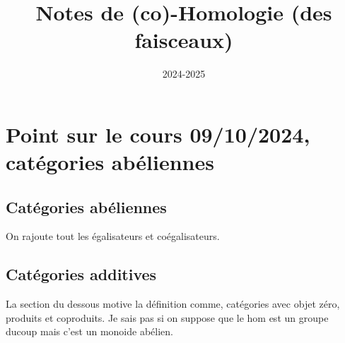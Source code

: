 \documentclass[a4paper,12pt]{book}
\title{Notes de (co)-Homologie (des faisceaux)}
\date{2024-2025}
\theoremstyle{plain}
\theoremstyle{definition}
\theoremstyle{remark}
\begin{document}
\maketitle
\tableofcontents
\chapter{Point sur le cours 09/10/2024, catégories abéliennes}

\section{Catégories abéliennes}
On rajoute tout les égalisateurs et coégalisateurs.
\section{Catégories additives}
La section du dessous motive la définition comme, catégories avec objet
zéro, produits et coproduits. Je sais pas si on suppose que le hom est
un groupe ducoup mais c'est un monoide abélien.
\end{document}
